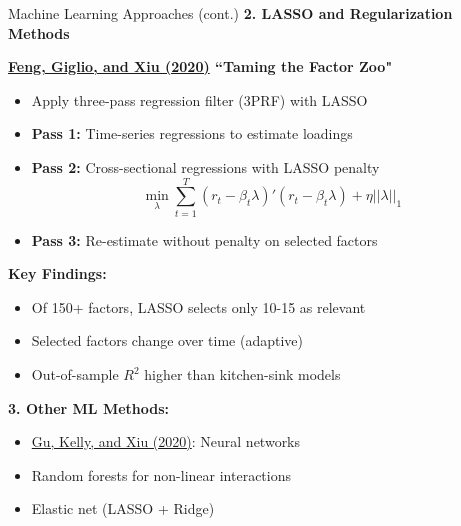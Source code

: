 \documentclass{beamer}
\begin{document}
\begin{frame}{Machine Learning Approaches (cont.)}
    \textbf{2. LASSO and Regularization Methods}
    
    \textbf{\textcolor{blue}{\href{https://doi.org/10.1111/jofi.12883}{Feng, Giglio, and Xiu (2020)}} ``Taming the Factor Zoo"}
    \begin{itemize}
        \item Apply three-pass regression filter (3PRF) with LASSO
        \item \textbf{Pass 1:} Time-series regressions to estimate loadings
        \item \textbf{Pass 2:} Cross-sectional regressions with LASSO penalty
        \begin{equation*}
            \min_{\lambda} \sum_{t=1}^T (r_t - \beta_t \lambda)' (r_t - \beta_t \lambda) + \eta ||\lambda||_1
        \end{equation*}
        \item \textbf{Pass 3:} Re-estimate without penalty on selected factors
    \end{itemize}
    
    
    \textbf{Key Findings:}
    \begin{itemize}
        \item Of 150+ factors, LASSO selects only 10-15 as relevant
        \item Selected factors change over time (adaptive)
        \item Out-of-sample $R^2$ higher than kitchen-sink models
    \end{itemize}
    
    
    \textbf{3. Other ML Methods:}
    \begin{itemize}
        \item \textcolor{blue}{\href{https://doi.org/10.1093/rfs/hhaa009}{Gu, Kelly, and Xiu (2020)}}: Neural networks
        \item Random forests for non-linear interactions
        \item Elastic net (LASSO + Ridge)
    \end{itemize}
\end{frame}
\end{document}
